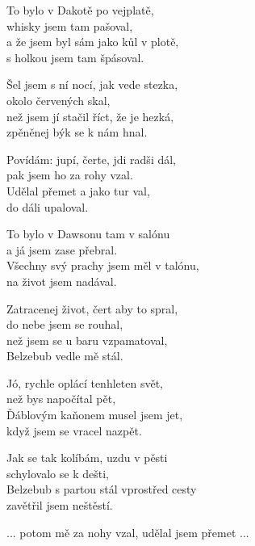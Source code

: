 
\ve{}
To bylo v Dakotě po vejplatě,\\
whisky jsem tam pašoval,\\
a že jsem byl sám jako kůl v plotě,\\
s holkou jsem tam špásoval.

\vspace{-2 pt}
\ve{}
Šel jsem s ní nocí, jak vede stezka,\\
okolo červených skal,\\
než jsem jí stačil říct, že je hezká,\\
zpěněnej býk se k nám hnal.

\cho{}
Povídám: jupí, čerte, jdi radši dál,\\
pak jsem ho za rohy vzal.\\
Udělal přemet a jako tur val,\\
do dáli upaloval.

\vspace{-2 pt}
\ve{}
To bylo v Dawsonu tam v salónu\\
a já jsem zase přebral.\\
Všechny svý prachy jsem měl v talónu,\\
na život jsem nadával.

\vspace{-2 pt}
\ve{}
Zatracenej život, čert aby to spral,\\
do nebe jsem se rouhal,\\
než jsem se u baru vzpamatoval,\\
Belzebub vedle mě stál.

\vspace{-2 pt}
\cho{}

\vspace{-2 pt}
\ve{}
Jó, rychle oplácí tenhleten svět,\\
než bys napočítal pět,\\
Ďáblovým kaňonem musel jsem jet,\\
když jsem se vracel nazpět.

\vspace{-2 pt}
\ve{}
Jak se tak kolíbám, uzdu v pěsti\\
schylovalo se k dešti,\\
Belzebub s partou stál vprostřed cesty\\
zavětřil jsem neštěstí.

\vspace{-2 pt}
\cho{}
... potom mě za nohy vzal, udělal jsem přemet ...

\esong